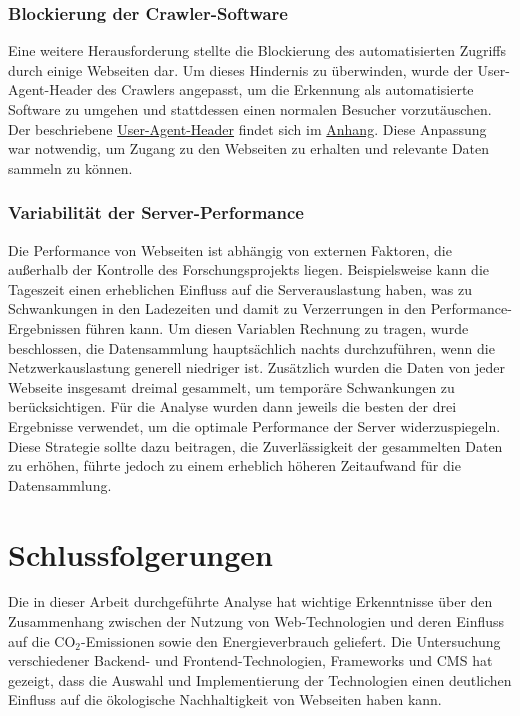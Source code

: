 \documentclass[Bachelor,BIF,german,IEEE]{BASE/twbook}
\begin{document}
\subsubsection{Blockierung der Crawler-Software}
Eine weitere Herausforderung stellte die Blockierung des automatisierten Zugriffs durch einige Webseiten dar. Um dieses Hindernis zu überwinden, wurde der User-Agent-Header des Crawlers angepasst, um die Erkennung als automatisierte Software zu umgehen und stattdessen einen normalen Besucher vorzutäuschen. Der beschriebene \hyperref[code:useragent]{User-Agent-Header} findet sich im \hyperref[chap:appendix]{Anhang}. Diese Anpassung war notwendig, um Zugang zu den Webseiten zu erhalten und relevante Daten sammeln zu können.

\subsubsection{Variabilität der Server-Performance}
Die Performance von Webseiten ist abhängig von externen Faktoren, die außerhalb der Kontrolle des Forschungsprojekts liegen. Beispielsweise kann die Tageszeit einen erheblichen Einfluss auf die Serverauslastung haben, was zu Schwankungen in den Ladezeiten und damit zu Verzerrungen in den Performance-Ergebnissen führen kann. Um diesen Variablen Rechnung zu tragen, wurde beschlossen, die Datensammlung hauptsächlich nachts durchzuführen, wenn die Netzwerkauslastung generell niedriger ist. Zusätzlich wurden die Daten von jeder Webseite insgesamt dreimal gesammelt, um temporäre Schwankungen zu berücksichtigen. Für die Analyse wurden dann jeweils die besten der drei Ergebnisse verwendet, um die optimale Performance der Server widerzuspiegeln. Diese Strategie sollte dazu beitragen, die Zuverlässigkeit der gesammelten Daten zu erhöhen, führte jedoch zu einem erheblich höheren Zeitaufwand für die Datensammlung.


\section{Schlussfolgerungen}

Die in dieser Arbeit durchgeführte Analyse hat wichtige Erkenntnisse über den Zusammenhang zwischen der Nutzung von Web-Technologien und deren Einfluss auf die CO$_2$-Emissionen sowie den Energieverbrauch geliefert. Die Untersuchung verschiedener Backend- und Frontend-Technologien, Frameworks und \ac{CMS} hat gezeigt, dass die Auswahl und Implementierung der Technologien einen deutlichen Einfluss auf die ökologische Nachhaltigkeit von Webseiten haben kann. \newline
\end{document}
